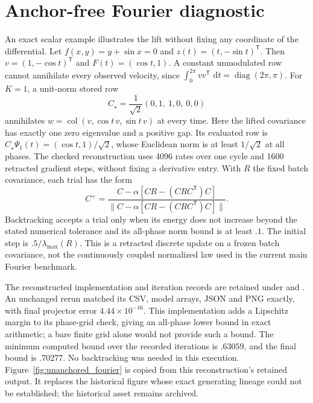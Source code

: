 \documentclass[journal]{IEEEtran}
\newcommand{\func}[1]{\operatorname{#1}}
\newcommand{\col}{\operatorname{col}}
\begin{document}
\section{Anchor-free Fourier diagnostic}
\label{sec:unanchored}
An exact scalar example illustrates the lift without fixing any coordinate
of the differential. Let $f(x,y)=y+\sin x=0$ and $z(t)=(t,-\sin t)^{\mathsf{T%
}}$. Then $v=(1,-\cos t)^{\mathsf{T}}$ and $F(t)=(\cos t,1)$. A constant
unmodulated row cannot annihilate every observed velocity, since $%
\int_0^{2\pi}vv^{\mathsf{T}}\,\,\mathrm{d} t =\func{diag}(2\pi,\pi)$. For $%
K=1$, a unit-norm stored row 
\begin{equation}
C_\star=\frac1{\sqrt2}(0,1,\ 1,0,\ 0,0)  \label{eq:fourier_example}
\end{equation}
annihilates $w=\col(v,\cos t\,v,\sin t\,v)$ at every time. Here the lifted
covariance has exactly one zero eigenvalue and a positive gap. Its evaluated
row is $C_\star\Psi_1(t)=(\cos t,1)/\sqrt2$, whose Euclidean norm is at
least $1/\sqrt2$ at all phases. The checked reconstruction uses 4096 rates
over one cycle and 1600 retracted gradient steps, without fixing a derivative
entry. With $R$ the fixed batch covariance, each trial has the form
\begin{equation}
 C^+=\frac{C-\alpha[C R-(C R C^{\mathsf T})C]}
 {\|C-\alpha[C R-(C R C^{\mathsf T})C]\|}.
\end{equation}
Backtracking accepts a trial only when its energy does not increase beyond
the stated numerical tolerance and its all-phase norm bound is at least
$.1$. The initial step is $.5/\lambda_{\max}(R)$. This is a retracted
discrete update on a frozen batch covariance, not the continuously coupled
normalized law used in the current main Fourier benchmark.

The reconstructed implementation and iteration records are retained under
 and
. An unchanged rerun matched
its CSV, model arrays, JSON and PNG exactly, with final projector error
$4.44\times10^{-16}$. This implementation adds a Lipschitz margin to its
phase-grid check, giving an all-phase lower bound in exact arithmetic;
a bare finite grid alone would not provide such a bound. The minimum
computed bound over the recorded iterations is $.63059$, and the final
bound is $.70277$. No backtracking was needed in this execution.
Figure~\ref{fig:unanchored_fourier} is copied from this reconstruction's
retained output. It replaces the historical figure whose exact generating
lineage could not be established; the historical asset remains archived.
\end{document}
